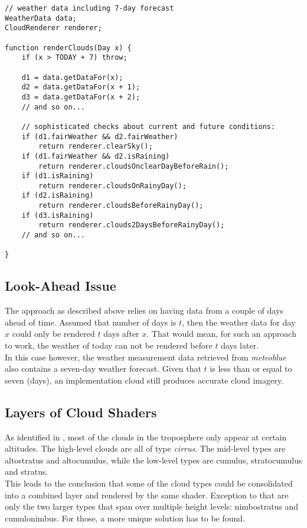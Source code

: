 \begin{lstlisting}[language=HLSL, caption=Pseudo-code of cloud render algorithm., label=lst:pseudo:algorithm]
// weather data including 7-day forecast
WeatherData data;
CloudRenderer renderer;

function renderClouds(Day x) {
    if (x > TODAY + 7) throw;

    d1 = data.getDataFor(x);
    d2 = data.getDataFor(x + 1);
    d3 = data.getDataFor(x + 2);
    // and so on...

    // sophisticated checks about current and future conditions:
    if (d1.fairWeather && d2.fairWeather)
        return renderer.clearSky();
    if (d1.fairWeather && d2.isRaining)
        return renderer.cloudsOnclearDayBeforeRain();
    if (d1.isRaining)
        return renderer.cloudsOnRainyDay();
    if (d2.isRaining) 
        return renderer.cloudsBeforeRainyDay();
    if (d3.isRaining) 
        return renderer.clouds2DaysBeforeRainyDay();
    // and so on...
    
}
\end{lstlisting}

\clearpage

\subsection{Look-Ahead Issue}
The approach as described above relies on having data from a couple of days ahead of time. Assumed that number of days is $t$, then the weather data for day $x$ could only be rendered $t$ days after $x$.
That would mean, for such an approach to work, the weather of today can not be rendered before $t$ days later.
\\
In this case however, the weather measurement data retrieved from \emph{meteoblue} also contains a seven-day weather forecast. 
Given that $t$ is less than or equal to seven (days), an implementation cloud still produces accurate cloud imagery.

\subsection{Layers of Cloud Shaders}
\label{section:impl:layers}
As identified in , most of the clouds in the troposphere only appear at certain \gls{altitude}s.
The high-level clouds are all of type \emph{cirrus}.
The mid-level types are altostratus and altocumulus, while the low-level types are cumulus, stratocumulus and stratus.
\\
This leads to the conclusion that some of the cloud types could be consolidated into a combined layer and rendered by the same shader.
Exception to that are only the two larger types that span over multiple height levels: nimbostratus and cumulonimbus. For those, a more unique solution has to be found.

